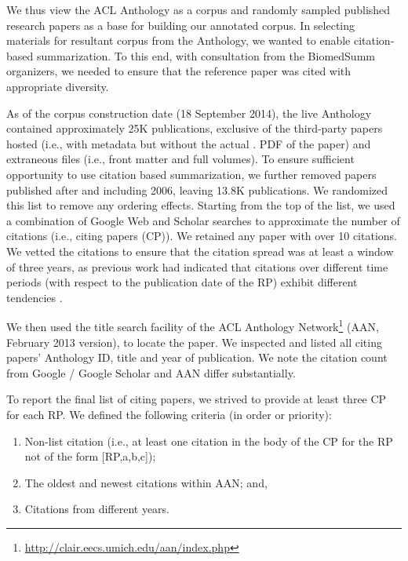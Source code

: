 \documentclass[11pt]{article}
\begin{document}
We thus view the ACL Anthology as a corpus and randomly sampled
published research papers as a base for building our annotated corpus.
In selecting materials for resultant corpus from the Anthology, we
wanted to enable citation-based summarization. To this end, with
consultation from the BiomedSumm organizers, we needed to ensure that
the reference paper was cited with appropriate diversity.

As of the corpus construction date (18 September 2014), the live
Anthology contained approximately 25K publications, exclusive of the
third-party papers hosted (i.e., with metadata but without the actual
. PDF of the paper) and extraneous files (i.e., front matter and full
volumes).  To ensure sufficient opportunity to use citation based
summarization, we further removed papers published after and including
2006, leaving 13.8K publications.  We randomized this list to remove
any ordering effects.  Starting from the top of the list, we used a
combination of Google Web and Scholar searches to approximate the
number of citations (i.e., citing papers (CP)). We retained any paper
with over 10 citations.  We vetted the citations to ensure that the
citation spread was at least a window of three years, as previous work
had indicated that citations over different time periods (with respect
to the publication date of the RP) exhibit different tendencies
\cite{Drago's work}.

We then used the title search facility of the ACL Anthology
Network\footnote{\url{http://clair.eecs.umich.edu/aan/index.php}}
(AAN, February 2013 version), to locate the paper. We inspected and
listed all citing papers' Anthology ID, title and year of publication.
We note the citation count from Google / Google Scholar and AAN differ
substantially.

To report the final list of citing papers, we strived to provide at
least three CP for each RP. We defined the following
criteria (in order or priority):
\begin{enumerate}
\item Non-list citation (i.e., at least one citation in the body of
  the CP for the RP not of the form [RP,a,b,c]);
\vspace{-.3cm}
\item The oldest and newest
citations within AAN; and, 
\vspace{-.3cm}
\item Citations from different years. 
\end{enumerate}
\end{document}

